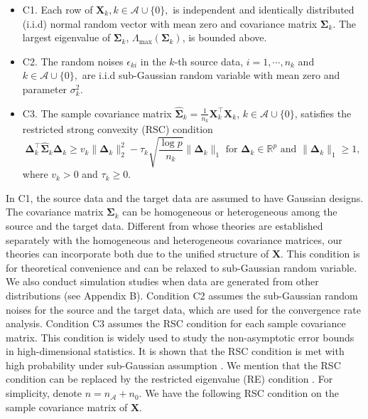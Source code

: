 \documentclass[twoside,12pt]{article}
\newcommand{\mb}[1]{\boldsymbol{\mathbf{#1}}}
\begin{document}
	\begin{itemize}
		\item C1. Each row of $\mb X_k, k\in\mathcal{A}\cup \{0\},$ is independent and identically distributed (i.i.d) normal random vector with mean zero and covariance matrix $\mb\Sigma_k$. 
		The largest eigenvalue of $\mb\Sigma_k$, $\Lambda_{\text{max}}(\mb\Sigma_k)$, is bounded above.
		\item C2. The random noises $\epsilon_{ki}$ in the $k$-th source data, $i=1, \cdots, n_k$ and $k\in\mathcal{A}\cup \{0\},$ are i.i.d sub-Gaussian random variable with mean zero and parameter $\sigma_k^2$.
		\item C3. The sample covariance matrix 
		$\widehat{\mb\Sigma}_k=\frac{1}{n_k}\mb X_k^\top\mb X_k$, $k\in\mathcal{A}\cup \{0\}$, satisfies the restricted strong convexity (RSC) condition 
		$$
		\mb{\Delta}_k^{\top} \widehat{\boldsymbol{\Sigma}}_k \boldsymbol{\Delta}_k \geq v_k\|\boldsymbol{\Delta}_k\|_{2}^{2}-\tau_k \sqrt{\frac{\log p}{n_k}}\|\boldsymbol{\Delta}_k\|_{1} \text { for } \boldsymbol{\Delta}_k \in \mathbb{R}^{p} \text { and }\|\boldsymbol{\Delta}_k\|_{1} \geq 1,
		$$
		where $v_k>0$ and $\tau_k\geq 0$. 
	\end{itemize}

    In C1, the source data and the target data are assumed to have Gaussian designs.
    The covariance matrix $\mb\Sigma_k$ can be homogeneous or heterogeneous among the source and the target data.
    Different from \cite{Li2022} whose theories are established separately with the homogeneous and heterogeneous covariance matrices, our theories can incorporate both due to the unified structure of $\mb X$.
    This condition is for theoretical convenience and can be relaxed to sub-Gaussian random variable.
    We also conduct simulation studies when data are generated from other distributions (see Appendix B).
    Condition C2 assumes the sub-Gaussian random noises for the source and the target data, which are used for the convergence rate analysis.
    Condition C3 assumes the RSC condition for each sample covariance matrix. 
    This condition is widely used to study the non-asymptotic error bounds in high-dimensional statistics.
    It is shown that the RSC condition is met with high probability under sub-Gaussian assumption \citep{Alekh2012, Loh2015, liu2022multiple}.
    We mention that the RSC condition can be replaced by the restricted eigenvalue (RE) condition \citep{bickel2009simultaneous, van2009conditions}.
    For simplicity, denote $n=n_{\mathcal A}+n_0$.
    We have the following RSC condition on the sample covariance matrix of $\mb X$.
        
\end{document}
